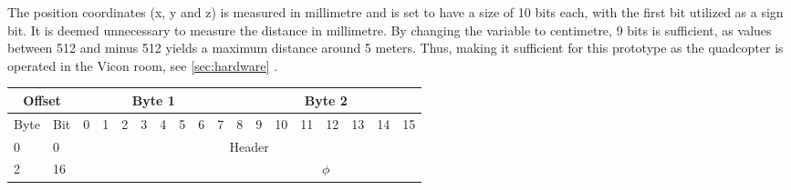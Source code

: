 The position coordinates (x, y and z) is measured in millimetre and is set to have a size of 10 bits each, with the first bit utilized as a sign bit. It is deemed unnecessary to measure the distance in millimetre. By changing the variable to centimetre, 9 bits is sufficient, as values between 512 and minus 512 yields a maximum distance around 5 meters. Thus, making it sufficient for this prototype as the quadcopter is operated in the Vicon room, see \autoref{sec:hardware} .    






\begin{table}[H]
\centering
\begin{tabular}{llclllllllllllllll}
\hline
\multicolumn{2}{|c|}{Offset}                          & \multicolumn{8}{c|}{Byte 1}                                                                                                                                                                           & \multicolumn{8}{c|}{Byte 2}                                                                                                                                                                                 \\ \hline
\multicolumn{1}{|l|}{Byte} & \multicolumn{1}{l|}{Bit} & \multicolumn{1}{c|}{0} & \multicolumn{1}{c|}{1} & \multicolumn{1}{c|}{2} & \multicolumn{1}{c|}{3} & \multicolumn{1}{c|}{4} & \multicolumn{1}{c|}{5} & \multicolumn{1}{c|}{6} & \multicolumn{1}{c|}{7} & \multicolumn{1}{c|}{8} & \multicolumn{1}{l|}{9} & \multicolumn{1}{l|}{10} & \multicolumn{1}{l|}{11} & \multicolumn{1}{l|}{12} & \multicolumn{1}{l|}{13} & \multicolumn{1}{l|}{14} & \multicolumn{1}{l|}{15} \\ \hline
\multicolumn{1}{|l|}{0}    & \multicolumn{1}{l|}{0}   & \multicolumn{16}{c|}{Header}                                                                                                                                                                                                                                                                                                                                                                                        \\ \hline
\multicolumn{1}{|l|}{2}    & \multicolumn{1}{l|}{16}  & \multicolumn{8}{l|}{}                                                                                                                                                                                 & \multicolumn{8}{c|}{$\phi$}                                                                                                                                                                                 \\ \hline

\end{tabular}
\end{table}
